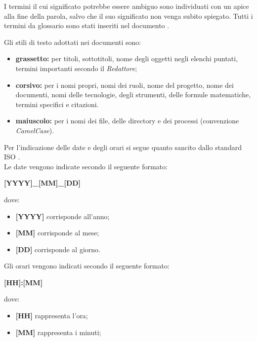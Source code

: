 I termini il cui significato potrebbe essere ambiguo sono individuati con un apice  alla fine della parola, salvo che il suo significato non venga subito spiegato. Tutti i termini da glossario sono stati inseriti nel documento \Glossariov.

Gli stili di testo adottati nei documenti sono:
\begin{itemize}
	\item \textbf{grassetto:} per titoli, sottotitoli, nome degli oggetti negli elenchi puntati, termini importanti secondo il \textit{Redattore};
	\item \textbf{corsivo:} per i nomi propri, nomi dei ruoli, nome del progetto, nome dei documenti, nomi delle tecnologie, degli strumenti, delle formule matematiche, termini specifici e citazioni.
	\item \textbf{maiuscolo:} per i nomi dei file, delle directory e dei processi (convenzione \textit{CamelCase}).	
\end{itemize}

Per l'indicazione delle date e degli orari si segue quanto sancito dallo standard ISO . \\
Le date vengono indicate secondo il seguente formato:
\begin{center}
	\textbf{[YYYY]\_[MM]\_[DD]} 
\end{center}
dove:
\begin{itemize}
	\item \textbf{[YYYY]} corrisponde all'anno;
	\item \textbf{[MM]} corrisponde al mese;
	\item \textbf{[DD]} corrisponde al giorno.
\end{itemize}
Gli orari vengono indicati secondo il seguente formato:
\begin{center}
	\textbf{[HH]:[MM]} 
\end{center}
dove:
\begin{itemize}
	\item \textbf{[HH]} rappresenta l'ora;
	\item \textbf{[MM]} rappresenta i minuti;
\end{itemize}

